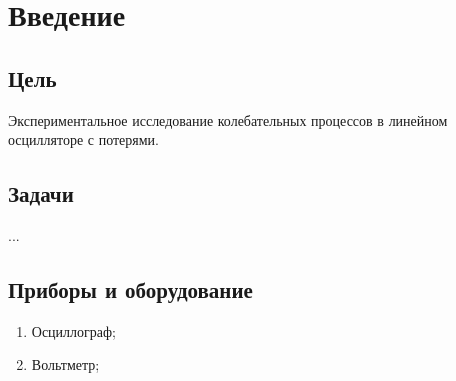 \section{Введение}
\subsection{Цель}
Экспериментальное исследование колебательных процессов в линейном осцилляторе с потерями. 

\subsection{Задачи}
...

\subsection{Приборы и оборудование}
\begin{enumerate}
	\item Осциллограф;
	\item Вольтметр;
\end{enumerate}